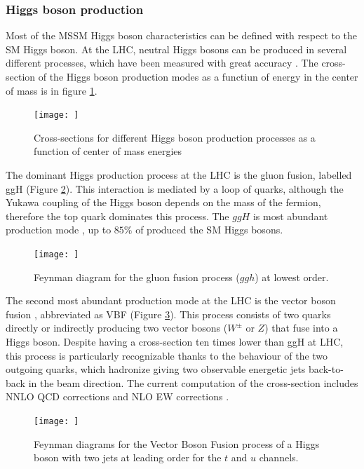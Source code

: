 \subsubsection{Higgs boson production}

Most of the MSSM Higgs boson characteristics can be defined with respect to the SM Higgs boson. At the LHC, neutral Higgs bosons can be produced in several different processes, which have been measured with great accuracy \cite{Dittmaier:1318996}. The cross-section of the Higgs boson production modes as a functiun of energy in the center of mass is in figure \ref{fig:higgscrosssec}.

\begin{figure}
    \centering
    \texttt{[image: ]}
    \caption{Cross-sections for different Higgs boson production processes as a function of center of mass energies}
    \label{fig:higgscrosssec}
\end{figure}

The dominant Higgs production process at the LHC is the gluon fusion, labelled ggH (Figure \ref{fig:ggh}). This interaction is mediated by a loop of quarks, although the Yukawa coupling of the Higgs boson depends on the mass of the fermion, therefore the top quark dominates this process. The $ggH$ is most abundant production mode , up to $85\%$ of produced the SM Higgs bosons.


\begin{figure}
    \centering
    \texttt{[image: ]}
    \caption{Feynman diagram for the gluon fusion process ($ggh$) at lowest order.}
    \label{fig:ggh}
\end{figure}


The second most abundant production mode at the LHC is the vector boson fusion \cite{PhysRevD.85.035002}, abbreviated as VBF (Figure \ref{fig:vbf}). This process consists of two quarks directly or indirectly producing two vector bosons ($W^{\pm}$ or $Z$) that fuse into a Higgs boson. Despite having a cross-section ten times lower than ggH at LHC, this process is particularly recognizable thanks to the behaviour of the two outgoing quarks, which hadronize giving two observable energetic jets back-to-back in the beam direction. The current computation of the cross-section includes NNLO QCD corrections and NLO EW corrections \cite{deFlorian:2227475}.

\begin{figure}
    \centering
    \texttt{[image: ]}
    \caption{Feynman diagrams for the Vector Boson Fusion process of a Higgs boson with two jets at leading order for the $t$ and $u$ channels.}
    \label{fig:vbf}
\end{figure}

